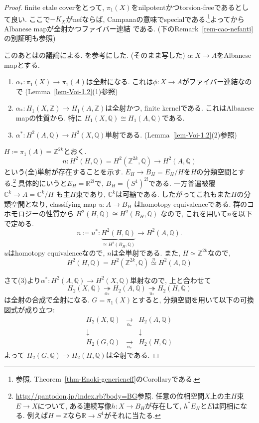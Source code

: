 \documentclass[dvipdfmx,a4paper,11pt]{article} %
\theoremstyle{definition}
\theoremstyle{remark}
\numberwithin{equation}{section}
\newcommand{\R}{\mathbb{R}}
\newcommand{\Z}{\mathbb{Z}}
\newcommand{\C}{\mathbb{C}}
\newcommand{\Q}{\mathbb{Q}}
\begin{document}
\begin{proof}
finite etale coverをとって, $\pi_1(X)$をnilpotentかつtorsion-freeであるとして良い. 
ここで$-K_X$がnefならば, Campanaの意味でspecialである.\footnote{\cite[Remark 2.22]{Iwa-Cam}参照. Theorem~\ref{thm-Enoki-genericneff}のCorollaryである.}よって\cite[Subsection 5.2]{Iwa-Cam}からAlbanese mapが全射かつファイバー連結
である. (下のRemark~\ref{rem-cao-nefanti}の別証明も参照)

このあとは\cite{Cam95a}の議論による. \cite[Theorem 3.23]{Voi}を参考にした. 
(\cite[Subsection 7.2]{Iwa-Cam}そのまま写した)
$\alpha \colon X \to A$をAlbanese mapとする. 
 \begin{enumerate}
 \item \(\alpha_* \colon \pi_1(X) \to \pi_1(A)\)は全射になる. これは\( \phi \colon X \to A\)がファイバー連結なので (Lemma~\ref{lem-Voi-1.2}(1)参照)
\item  \( \alpha_* \colon H_1(X, \mathbb{Z}) \to H_1(A, \mathbb{Z}) \)は全射かつ, finite kernelである. これはAlbanese mapの性質から. 特に $H_1(X, \mathbb{Q})  \cong H_1(A, \mathbb{Q}) $である. 
\item \( \alpha^* \colon H^2(A, \mathbb{Q}) \to H^2(X, \mathbb{Q}) \)単射である. (Lemma~\ref{lem-Voi-1.2}(2)参照)
\end{enumerate}

\( H \coloneqq  \pi_1(A) =\Z^{2k}\)とおく.
\[
n\colon H^2(H, \mathbb{Q}) =H^2(\Z^{2k}, \Q)\to H^2(A, \mathbb{Q})
\]
という(全)単射が存在することを示す. 
\(E_H \to B_H = E_H / H\)を$H$の分類空間とする.\footnote{\url{http://pantodon.jp/index.rb?body=BG}参照. 任意の位相空間$X$上の主$H$束$E \to X$について, ある連続写像$h \colon X \to B_H$が存在して, $h^{*}E_H$と$E$は同相になる. 例えば$H=\Z$なら$\R\to S^1$がそれに当たる. } 
具体的にいうと\(E_H=\R^{2l}\)で, $B_H=(S^1)^{2l}$である. 
一方普遍被覆
\(
\C^k\to A=\C^k/H
\)
も主$H$束であり, $\C^k$は可縮である. 
したがってこれもまた$H$の分類空間となり, classifying map
\(
u\colon A\to B_H
\)
はhomotopy equivalenceである. 
群のコホモロジーの性質から
\(
H^2(H,\Q)\cong H^2(B_H,\Q)
\)
なので, これを用いて$n$を以下で定める.
\[
n\coloneqq u^{*} \colon \underbrace{H^2(H,\Q)}_{\cong H^2(B_H, \mathbb{Q})} \to H^2(A, \mathbb{Q}).
\]
$u$はhomotopy equivalenceなので, $n$は全単射である. 
また, $H\simeq\Z^{2k}$なので,
\[
H^2(H,\Q)
=
H^2(\Z^{2k},\Q)
\overset{n}{\simeq}
H^2(A,\Q)
\]

さて(3)より\( \alpha^* \colon H^2(A, \mathbb{Q}) \to H^2(X, \mathbb{Q}) \)単射なので, 上と合わせて
 \[  
 H_2(X, \mathbb{Q}) \underset{\alpha_*}{\twoheadrightarrow} 
  H_2(A, \mathbb{Q}) \underset{u_{*}}{\twoheadrightarrow} 
 H_2(H, \mathbb{Q}) 
 \]
 は全射の合成で全射になる. 
 \( G = \pi_1(X) \)とすると, 分類空間を用いて以下の可換図式が成り立つ:
\[
\begin{array}{ccc}
H_2(X, \mathbb{Q}) & \underset{\alpha_*}{\longrightarrow}& H_2(A, \mathbb{Q}) \\
\downarrow & & \downarrow \\
H_2(G, \mathbb{Q}) & \underset{\alpha_*}{\longrightarrow} & H_2(H, \mathbb{Q})
\end{array}
\]
よって  \(H_2(G, \mathbb{Q}) \to H_2(H, \mathbb{Q}) \)は全射である. 


\end{proof}
\end{document}
